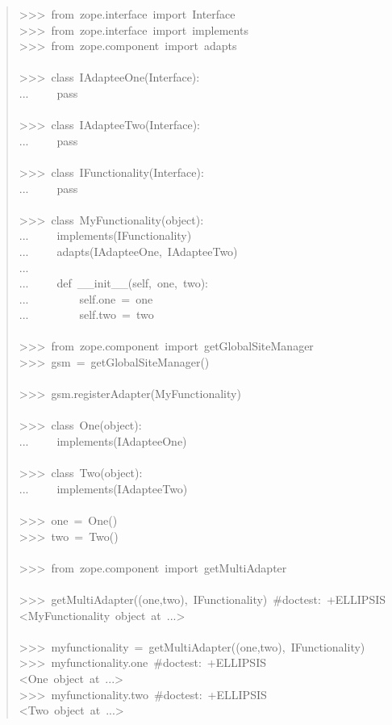\documentclass[14pt,a4paper,openany,twoside,final]{extbook}
\begin{document}
\begin{quote}{\ttfamily \raggedright \noindent
>{}>{}>~from~zope.interface~import~Interface\\
>{}>{}>~from~zope.interface~import~implements\\
>{}>{}>~from~zope.component~import~adapts\\
~\\
>{}>{}>~class~IAdapteeOne(Interface):\\
...~~~~~pass\\
~\\
>{}>{}>~class~IAdapteeTwo(Interface):\\
...~~~~~pass\\
~\\
>{}>{}>~class~IFunctionality(Interface):\\
...~~~~~pass\\
~\\
>{}>{}>~class~MyFunctionality(object):\\
...~~~~~implements(IFunctionality)\\
...~~~~~adapts(IAdapteeOne,~IAdapteeTwo)\\
...\\
...~~~~~def~\_\_init\_\_(self,~one,~two):\\
...~~~~~~~~~self.one~=~one\\
...~~~~~~~~~self.two~=~two\\
~\\
>{}>{}>~from~zope.component~import~getGlobalSiteManager\\
>{}>{}>~gsm~=~getGlobalSiteManager()\\
~\\
>{}>{}>~gsm.registerAdapter(MyFunctionality)\\
~\\
>{}>{}>~class~One(object):\\
...~~~~~implements(IAdapteeOne)\\
~\\
>{}>{}>~class~Two(object):\\
...~~~~~implements(IAdapteeTwo)\\
~\\
>{}>{}>~one~=~One()\\
>{}>{}>~two~=~Two()\\
~\\
>{}>{}>~from~zope.component~import~getMultiAdapter\\
~\\
>{}>{}>~getMultiAdapter((one,two),~IFunctionality)~\#doctest:~+ELLIPSIS\\
<MyFunctionality~object~at~...>\\
~\\
>{}>{}>~myfunctionality~=~getMultiAdapter((one,two),~IFunctionality)\\
>{}>{}>~myfunctionality.one~\#doctest:~+ELLIPSIS\\
<One~object~at~...>\\
>{}>{}>~myfunctionality.two~\#doctest:~+ELLIPSIS\\
<Two~object~at~...>
}
\end{quote}
\end{document}
